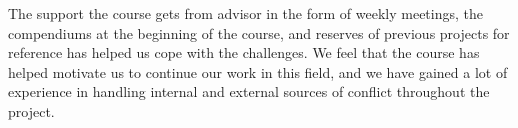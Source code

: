    The support the course gets from advisor in the form of weekly meetings, the
   compendiums at the beginning of the course, and reserves of previous projects
   for reference has helped us cope with the challenges. We feel that the course
   has helped motivate us to continue our work in this field, and we have gained
   a lot of experience in handling internal and external sources of conflict
   throughout the project.
